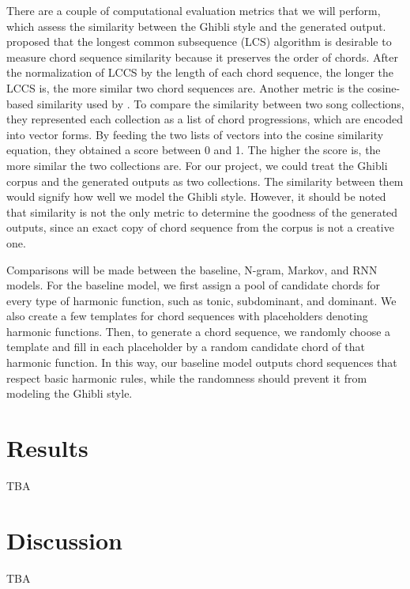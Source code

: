 \documentclass[11pt,a4paper]{article}
\begin{document}
There are a couple of computational evaluation metrics that we will perform, which assess the similarity between the Ghibli style and the generated output. \citet{cheng2008} proposed that the longest common subsequence (LCS) algorithm is desirable to measure chord sequence similarity because it preserves the order of chords. After the normalization of LCCS by the length of each chord sequence, the longer the LCCS is, the more similar two chord sequences are. Another metric is the cosine-based similarity used by \citet{ogihara2008}. To compare the similarity between two song collections, they represented each collection as a list of chord progressions, which are encoded into vector forms. By feeding the two lists of vectors into the cosine similarity equation, they obtained a score between 0 and 1. The higher the score is, the more similar the two collections are. For our project, we could treat the Ghibli corpus and the generated outputs as two collections. The similarity between them would signify how well we model the Ghibli style. However, it should be noted that similarity is not the only metric to determine the goodness of the generated outputs, since an exact copy of chord sequence from the corpus is not a creative one. 
	
Comparisons will be made between the baseline, N-gram, Markov, and RNN models. For the baseline model, we first assign a pool of candidate chords for every type of harmonic function, such as tonic, subdominant, and dominant. We also create a few templates for chord sequences with placeholders denoting harmonic functions. Then, to generate a chord sequence, we randomly choose a template and fill in each placeholder by a random candidate chord of that harmonic function. In this way, our baseline model outputs chord sequences that respect basic harmonic rules, while the randomness should prevent it from modeling the Ghibli style.

\section{Results}
TBA
\section{Discussion}
TBA


 

\end{document}
